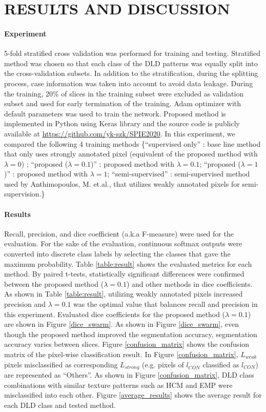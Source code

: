 \documentclass[]{spie}
\def\github{https://github.com/yk-szk/SPIE2020}
\begin{document}
\section{RESULTS AND DISCUSSION}
\paragraph{Experiment}
5-fold stratified cross validation was performed for training and testing.
Stratified method was chosen so that each class of the DLD patterns was equally split into the cross-validation subsets.
In addition to the stratification, during the splitting process, case information was taken into account to avoid data leakage.
During the training, 20\% of slices in the training subset were excluded as validation subset and used for early termination of the training.
Adam optimizer with default parameters was used to train the network.
Proposed method is implemented in Python using Keras library and the source code is publicly available at \href{\github}{\github}.
In this experiment, we compared the following 4 training methods
\{``supervised only'' : base line method that only uses strongly annotated pixel (equivalent of the proposed method with $\lambda=0$) ; ``proposed ($\lambda=0.1$)'' : proposed method with $\lambda=0.1$; ``proposed ($\lambda=1$)'' : proposed method with $\lambda=1$; ``semi-supervised'' : semi-supervised method used by Anthimopoulos, M. et.al.\cite{Anthimopoulos2019}, that utilizes weakly annotated pixels for semi-supervision.\}

\paragraph{Results}
Recall, precision, and dice coefficient (a.k.a F-measure) were used for the evaluation.
For the sake of the evaluation, continuous softmax outputs were converted into discrete class labels by selecting the classes that gave the maximum probability.
Table \ref{table:result} shows the evaluated metrics for each method.
By paired t-tests, statistically significant differences were confirmed between the proposed method ($\lambda=0.1$) and other methods in dice coefficients.
As shown in Table \ref{table:result}, utilizing weakly annotated pixels increased precision and $\lambda=0.1$ was the optimal value that balances recall and precision in this experiment.
Evaluated dice coefficients for the proposed method ($\lambda=0.1$) are shown in Figure \ref{dice_swarm}.
As shown in Figure \ref{dice_swarm}, even though the proposed method improved the segmentation accuracy, segmentation accuracy varies between slices.
Figure \ref{confusion_matrix} shows the confusion matrix of the pixel-wise classification result.
In Figure \ref{confusion_matrix}, $L_{weak}$ pixels misclassified as corresponding $L_{strong}$ (e.g. pixels of $l_{\overline{CON}}$ classified as $l_{CON}$) are represented as ``Others''.
As shown in Figure \ref{confusion_matrix}, DLD class combinations with similar texture patterns such as HCM and EMP were misclassified into each other.
Figure \ref{average_results} shows the average result for each DLD class and tested method.
\end{document}
